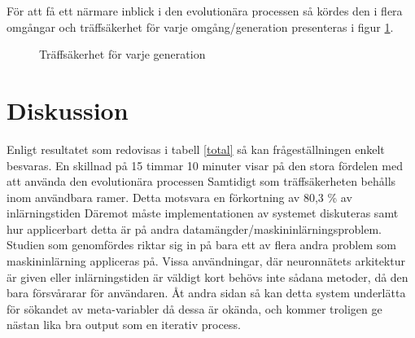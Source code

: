 \documentclass[a4paper, 12pt]{article}
\begin{document}
\newpage

För att få ett närmare inblick i den evolutionära processen så kördes den i flera omgångar och träffsäkerhet för varje omgång/generation presenteras i figur \ref{generation}.

\begin{figure}[H]
\centering
{}
\caption{Träffsäkerhet för varje generation}
\label{generation}
\end{figure}


  \section{Diskussion}
    Enligt resultatet som redovisas i tabell \ref{total} så kan frågeställningen enkelt besvaras. En skillnad på 15 timmar 10 minuter visar på den stora fördelen med att använda den evolutionära processen Samtidigt som träffsäkerheten behålls inom användbara ramer. Detta motsvara en förkortning av 80,3 \% av inlärningstiden Däremot måste implementationen av systemet diskuteras samt hur applicerbart detta är på andra datamängder/maskininlärningsproblem. Studien som genomfördes riktar sig in på bara ett av flera andra problem som maskininlärning appliceras på. Vissa användningar, där neuronnätets arkitektur är given eller inlärningstiden är väldigt kort behövs inte sådana metoder, då den bara försvårarar för användaren. Åt andra sidan så kan detta system underlätta för sökandet av meta-variabler då dessa är okända, och kommer troligen ge nästan lika bra output som en iterativ process.
\end{document}
